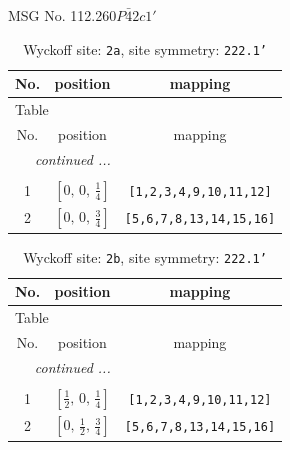 \documentclass[fleqn,8pt]{jsarticle}
\begin{document}
\setcounter{MaxMatrixCols}{32}

\renewcommand{\tablename}{Table~}
\renewcommand{\figurename}{Figure~}
\begin{center}
\LARGE
MSG No. 112.260\quad$P\bar{4}2c1'$
\end{center}
\renewcommand{\arraystretch}{1.2}
\begin{longtable}{ccc}
\caption{Wyckoff site: {\tt 2a}, site symmetry: {\tt 222.1'}}
 \\
 \hline \hline
No. & position & mapping \\ \hline \endfirsthead

\multicolumn{2}{l}{\tablename\ \thetable{}} \\
 \hline \hline
No. & position & mapping \\ \hline \endhead

 \hline \hline
\multicolumn{2}{r}{\footnotesize\it continued ...} \\ \endfoot

 \hline \hline
\multicolumn{2}{r}{} \\ \endlastfoot

1 & $\left[ 0,\, 0,\, \frac{1}{4} \right]$ & {\tt [1,2,3,4,9,10,11,12]} \\ \hline
2 & $\left[ 0,\, 0,\, \frac{3}{4} \right]$ & {\tt [5,6,7,8,13,14,15,16]} \\
\end{longtable}
\renewcommand{\arraystretch}{1.2}
\begin{longtable}{ccc}
\caption{Wyckoff site: {\tt 2b}, site symmetry: {\tt 222.1'}}
 \\
 \hline \hline
No. & position & mapping \\ \hline \endfirsthead

\multicolumn{2}{l}{\tablename\ \thetable{}} \\
 \hline \hline
No. & position & mapping \\ \hline \endhead

 \hline \hline
\multicolumn{2}{r}{\footnotesize\it continued ...} \\ \endfoot

 \hline \hline
\multicolumn{2}{r}{} \\ \endlastfoot

1 & $\left[ \frac{1}{2},\, 0,\, \frac{1}{4} \right]$ & {\tt [1,2,3,4,9,10,11,12]} \\ \hline
2 & $\left[ 0,\, \frac{1}{2},\, \frac{3}{4} \right]$ & {\tt [5,6,7,8,13,14,15,16]} \\
\end{longtable}
\end{document}
